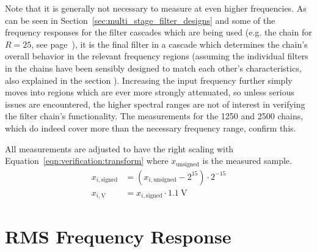 Note that it is generally not necessary to measure at even higher frequencies.
As can be seen in Section~\ref{sec:multi_stage_filter_designs} and some of the
frequency responses  for the filter  cascades which  are being used  (e.g. the
chain for  $R=25$, see page~\pageref{sec:filter_frequency_responses:chain25}),
it  is   the  final  filter  in   a  cascade  which  determines   the  chain's
overall   behavior   in  the   relevant   frequency   regions  (assuming   the
individual   filters  in   the   chains  have   been   sensibly  designed   to
match   each  other's   characteristics,   also  explained   in  the   section
\emph{}).    Increasing    the   input
frequency  further simply  moves into  regions  which are  ever more  strongly
attenuated,  so unless  serious issues  are encountered,  the higher  spectral
ranges are not of interest  in verifying the filter chain's functionality. The
measurements for the  \num{1250} and \num{2500} chains, which  do indeed cover
more than the necessary frequency range, confirm this.

All   measurements   are   adjusted   to   have   the   right   scaling   with
Equation~\ref{eqn:verification:transform}  where $x_\mathrm{unsigned}$  is the
measured sample.
\begin{align}
    \label{eqn:verification:transform}
    x_{i,\mathrm{signed}} &= \left(x_{i,\mathrm{unsigned}} - 2^{15}\right) \cdot 2^{-15} \\
    x_{i,\mathrm{V}}      &= x_{i,\mathrm{signed}} \cdot \SI{1.1}{\V}
\end{align}

%
%
\section{RMS Frequency Response} %
\label{sec:verification:rms}

